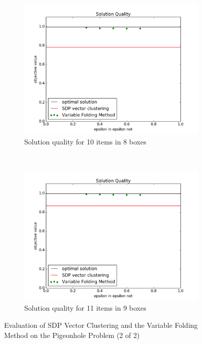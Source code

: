 \documentclass[12pt]{article} %
\begin{document}
\begin{figure}[htb]
\centering
	\begin{subfigure}[b]{0.45\textwidth}
	\centering
	\includegraphics[width=\textwidth]{solution_epsilon_n10m8}
	\caption{Solution quality for 10 items in 8 boxes}
	\label{n10m8}
	\end{subfigure}
	~
	\begin{subfigure}[b]{0.45\textwidth}
	\centering
	\includegraphics[width=\textwidth]{solution_epsilon_n11m9}
	\caption{Solution quality for 11 items in 9 boxes}
	\label{n11m9}
	\end{subfigure}
\caption{Evaluation of SDP Vector Clustering and the Variable Folding Method on the Pigeonhole Problem (2 of 2)}
\label{pigeon2}
\end{figure}
\end{document}
